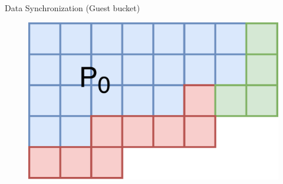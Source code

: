 \documentclass{beamer}
\begin{document}
\begin{frame}{Data Synchronization (Guest bucket)}
\begin{minipage}[b]{0.25\textwidth}
\begin{figure}
\includegraphics[width=\textwidth]{./PPT/Data_Syn_P0}
\end{figure}
\end{minipage}


\end{frame}
\end{document}
